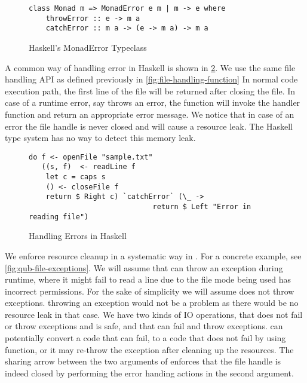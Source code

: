 \begin{figure}[h]
  \begin{framed}
\begin{verbatim}
class Monad m => MonadError e m | m -> e where
    throwError :: e -> m a
    catchError :: m a -> (e -> m a) -> m a
\end{verbatim}
  \end{framed}
  \caption{Haskell's MonadError Typeclass}
  \label{fig:haskell-monaderror}
\end{figure}

\noindent
A common way of handling error in Haskell is shown in \cref{fig:haskell-error-handling}.
We use the same file handling API as defined previously in \cref{fig:file-handling-function}
In normal code execution path, the first line of the file will be returned after closing the file.
In case of a runtime error, say  throws an error, the  function will
invoke the handler function and return an appropriate error message. We notice that in case of an error the file handle 
is never closed and will cause a resource leak. The Haskell type system has no way to detect this memory leak.

\begin{figure}[h]
  \begin{framed}
\begin{verbatim}
do f <- openFile "sample.txt"
   ((s, f)  <- readLine f
    let c = caps s
    () <- closeFile f
    return $ Right c) `catchError` (\_ ->
                             return $ Left "Error in reading file")
\end{verbatim}
  \end{framed}
  \caption{Handling Errors in Haskell}
  \label{fig:haskell-error-handling}
\end{figure}

We enforce resource cleanup in a systematic way in \qub{}. For a concrete example, see \cref{fig:qub-file-exceptions}.
We will assume that  can throw an exception during runtime, where
it might fail to read a line due to the file mode being used has incorrect permissions.
For the sake of simplicity we will assume 
does not throw exceptions.  throwing an exception would not be a problem as there would be
no resource leak in that case. We have two kinds of IO operations,  that does not fail or throw exceptions and is safe,
and  that can fail and throw exceptions.  can potentially convert a code that can fail, to a code
that does not fail by using  function, or it may re-throw the exception after
cleaning up the resources. The sharing arrow between the two arguments of  enforces
that the file handle is indeed closed by performing the error handing actions in the second argument.

